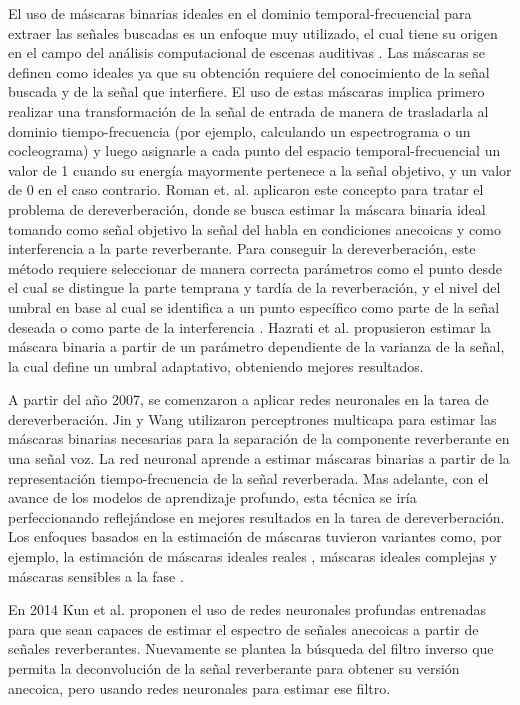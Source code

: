  
El uso de máscaras binarias ideales en el dominio temporal-frecuencial para extraer las señales buscadas \cite{binarymask} es un enfoque muy utilizado, el cual tiene su origen en el campo del análisis computacional de escenas auditivas \cite{ASA}. Las máscaras se definen como ideales ya que su obtención requiere del conocimiento de la señal buscada y de la señal que interfiere. El uso de estas máscaras implica primero realizar una transformación de la señal de entrada de manera de trasladarla al dominio tiempo-frecuencia (por ejemplo, calculando un espectrograma o un cocleograma) y luego asignarle a cada punto del espacio temporal-frecuencial un valor de 1 cuando su energía mayormente pertenece a la señal objetivo, y un valor de 0 en el caso contrario. Roman et. al. \cite{rev_mask} aplicaron este concepto para tratar el problema de dereverberación, donde se busca estimar la máscara binaria ideal tomando como señal objetivo la señal del habla en condiciones anecoicas y como interferencia a la parte reverberante. Para conseguir la dereverberación, este método requiere seleccionar de manera correcta parámetros como el punto desde el cual se distingue la parte temprana y tardía de la reverberación, y el nivel del umbral en base al cual se identifica a un punto específico como parte de la señal deseada o como parte de la interferencia \cite{parametros}. Hazrati et al. \cite{hazrati} propusieron estimar la máscara binaria a partir de un parámetro dependiente de la varianza de la señal, la cual define un umbral adaptativo, obteniendo mejores resultados. 

A partir del año 2007, se comenzaron a aplicar redes neuronales en la tarea de dereverberación. Jin y Wang \cite{MLP} utilizaron perceptrones multicapa para estimar las máscaras binarias necesarias para la separación de la componente reverberante en una señal voz. La red neuronal aprende a estimar máscaras binarias a partir de la representación tiempo-frecuencia de la señal reverberada. Mas adelante, con el avance de los modelos de aprendizaje profundo, esta técnica se iría perfeccionando reflejándose en mejores resultados en la tarea de dereverberación. Los enfoques basados en la estimación de máscaras tuvieron variantes como, por ejemplo, la estimación de máscaras ideales reales \cite{cIRM}, máscaras ideales complejas \cite{IRM} y máscaras sensibles a la fase \cite{GAN}.
  
En 2014 Kun et al. \cite{ezeKun} proponen el uso de redes neuronales profundas entrenadas para que sean capaces de estimar el espectro de señales anecoicas a partir de señales reverberantes. Nuevamente se plantea la búsqueda del filtro inverso que permita la deconvolución de la señal reverberante para obtener su versión anecoica, pero usando redes neuronales para estimar ese filtro. 

